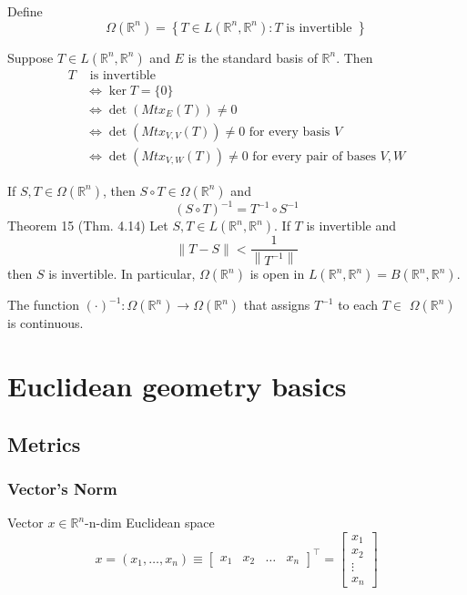 \documentclass[11pt]{elegantbook}
\begin{document}
Define
$$
\Omega\left(\mathbb{R}^n\right)=\left\{T \in L\left(\mathbb{R}^n, \mathbb{R}^n\right): T \text { is invertible }\right\}
$$
\begin{theorem}
    Suppose $T \in L\left(\mathbb{R}^n, \mathbb{R}^n\right)$ and $E$ is the standard basis of $\mathbb{R}^n$. Then
    $$
    \begin{aligned}
    T & \text { is invertible } \\
    & \Leftrightarrow \operatorname{ker} T=\{0\} \\
    & \Leftrightarrow \operatorname{det}\left(M t x_E(T)\right) \neq 0 \\
    & \Leftrightarrow \operatorname{det}\left(M t x_{V, V}(T)\right) \neq 0 \text { for every basis } V \\
    & \Leftrightarrow \operatorname{det}\left(M t x_{V, W}(T)\right) \neq 0 \text { for every pair of bases } V, W
    \end{aligned}
    $$
\end{theorem}

\begin{theorem}
    If $S, T \in \Omega\left(\mathbb{R}^n\right)$, then $S \circ T \in \Omega\left(\mathbb{R}^n\right)$ and
    $$
    (S \circ T)^{-1}=T^{-1} \circ S^{-1}
    $$
    Theorem 15 (Thm. 4.14) Let $S, T \in L\left(\mathbb{R}^n, \mathbb{R}^n\right)$. If $T$ is invertible and
    $$
    \|T-S\|<\frac{1}{\left\|T^{-1}\right\|}
    $$
    then $S$ is invertible. In particular, $\Omega\left(\mathbb{R}^n\right)$ is open in $L\left(\mathbb{R}^n, \mathbb{R}^n\right)=B\left(\mathbb{R}^n, \mathbb{R}^n\right)$.
\end{theorem}

\begin{theorem}
    The function $(\cdot)^{-1}: \Omega\left(\mathbb{R}^n\right) \rightarrow \Omega\left(\mathbb{R}^n\right)$ that assigns $T^{-1}$ to each $T \in$ $\Omega\left(\mathbb{R}^n\right)$ is continuous.
\end{theorem}



\chapter{Euclidean geometry basics}
\section{Metrics}
\subsection{Vector's Norm}
Vector $x \in \mathbb{R}^{n}$-n-dim Euclidean space
$$
x=\left(x_{1}, \ldots, x_{n}\right) \equiv\left[\begin{array}{llll}
x_{1} & x_{2} & \ldots & x_{n}
\end{array}\right]^{\top}=\left[\begin{array}{c}
x_{1} \\
x_{2} \\
\vdots \\
x_{n}
\end{array}\right]
$$
\end{document}
